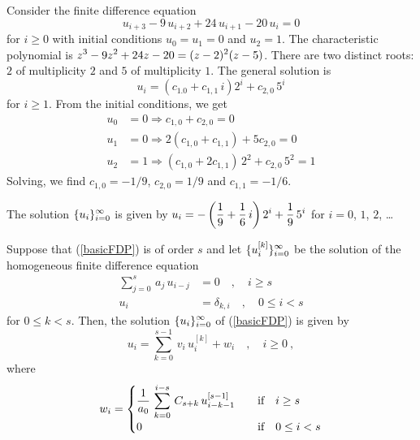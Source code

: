\begin{egg}
Consider the finite difference equation
\[
u_{i+3} -9\,u_{i+2} +24\,u_{i+1} -20\,u_i = 0
\]
for $i\geq 0$ with initial conditions $u_0 = u_1 = 0$ and $u_2 = 1$.
The characteristic polynomial is
$\displaystyle z^3 -9z^2 +24z -20 = (z-2)^2(z-5)$.
There are two distinct roots: $2$ of multiplicity $2$ and $5$ of
multiplicity $1$.  The general solution is
\[
u_i = (c_{1.0} + c_{1,1}\,i)2^i + c_{2,0}\,5^i
\]
for $i \geq 1$.  From the initial conditions, we get
\begin{align*}
u_0 &= 0 \Rightarrow c_{1,0}+c_{2,0} = 0 \\
u_1 &= 0 \Rightarrow 2(c_{1,0} +c_{1,1}) + 5 c_{2,0} = 0 \\
u_2 &= 1 \Rightarrow (c_{1,0}+ 2 c_{1,1})\,2^2 + c_{2,0}\,5^2 = 1
\end{align*}
Solving, we find $c_{1,0} = -1/9$, $c_{2,0} = 1/9$ and
$c_{1,1} = -1/6$.

The solution $\displaystyle \{u_i\}_{i=0}^\infty$ is given by
$\displaystyle u_i = -\left(\frac{1}{9}+\frac{1}{6}\,i\right)2^i +
\frac{1}{9}\,5^i$ for $i=0$, $1$, $2$, \ldots
\end{egg}

\begin{theorem}
Suppose that (\ref{basicFDP}) is of order $s$ and let
$\displaystyle \{ u_i^{[k]} \}_{i=0}^\infty$ be the solution of the
homogeneous finite difference equation 
\begin{align*}
\sum_{j=0}^s\,a_j\,u_{i-j} &= 0 \quad, \quad i \geq s \\
u_i &= \delta_{k,i} \quad, \quad 0 \leq i < s
\end{align*}
for $0 \leq k < s$.  Then, the solution
$\displaystyle \{ u_i \}_{i=0}^\infty$ of (\ref{basicFDP}) is given by
\begin{equation} \label{non_hom_solA}
u_i = \sum_{k=0}^{s-1}\,v_i\,u_i^{[k]} + w_i \quad, \quad i \geq 0 \ ,
\end{equation}
where
\begin{equation} \label{non_hom_solB}
w_i =  \begin{cases}
\displaystyle \frac{1}{a_0}\,\sum_{k=0}^{i-s}\,C_{s+k}\,u_{i-k-1}^{[s-1]} &
\quad \text{if} \quad i\geq s \\
0 & \quad \text{if} \quad 0 \leq i < s
\end{cases}
\end{equation}
\label{solNonHomFDP}
\end{theorem}

